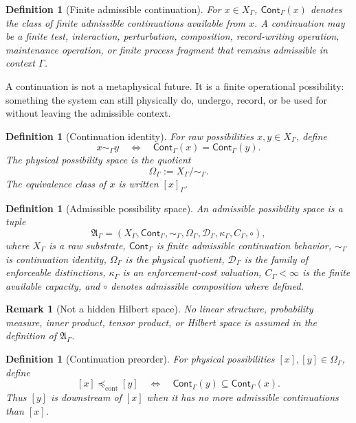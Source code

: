 \documentclass[11pt]{article}
\newtheorem{definition}[theorem]{Definition}
\newtheorem{remark}[theorem]{Remark}
\newcommand{\A}{\mathfrak A}
\newcommand{\Cont}{\mathsf{Cont}}
\newcommand{\preceqcont}{\preceq_{\mathrm{cont}}}
\begin{document}
\begin{definition}[Finite admissible continuation]
For $x\in X_\Gamma$, $\Cont_\Gamma(x)$ denotes the class of finite admissible continuations available from $x$.  A continuation may be a finite test, interaction, perturbation, composition, record-writing operation, maintenance operation, or finite process fragment that remains admissible in context $\Gamma$.
\end{definition}

A continuation is not a metaphysical future.  It is a finite operational possibility: something the system can still physically do, undergo, record, or be used for without leaving the admissible context.

\begin{definition}[Continuation identity]
For raw possibilities $x,y\in X_\Gamma$, define
\[
 x\sim_\Gamma y
 \quad\Longleftrightarrow\quad
 \Cont_\Gamma(x)=\Cont_\Gamma(y).
\]
The physical possibility space is the quotient
\[
 \Omega_\Gamma := X_\Gamma/\sim_\Gamma .
\]
The equivalence class of $x$ is written $[x]_\Gamma$.
\end{definition}

\begin{definition}[Admissible possibility space]
An \emph{admissible possibility space} is a tuple
\[
\A_\Gamma=
(X_\Gamma,\Cont_\Gamma,\sim_\Gamma,\Omega_\Gamma,
\mathcal D_\Gamma,\kappa_\Gamma,C_\Gamma,\circ),
\]
where $X_\Gamma$ is a raw substrate, $\Cont_\Gamma$ is finite admissible continuation behavior, $\sim_\Gamma$ is continuation identity, $\Omega_\Gamma$ is the physical quotient, $\mathcal D_\Gamma$ is the family of enforceable distinctions, $\kappa_\Gamma$ is an enforcement-cost valuation, $C_\Gamma<\infty$ is the finite available capacity, and $\circ$ denotes admissible composition where defined.
\end{definition}

\begin{remark}[Not a hidden Hilbert space]
No linear structure, probability measure, inner product, tensor product, or Hilbert space is assumed in the definition of $\A_\Gamma$.
\end{remark}

\begin{definition}[Continuation preorder]
For physical possibilities $[x],[y]\in\Omega_\Gamma$, define
\[
 [x]\preceqcont [y]
 \quad\Longleftrightarrow\quad
 \Cont_\Gamma(y)\subseteq \Cont_\Gamma(x).
\]
Thus $[y]$ is downstream of $[x]$ when it has no more admissible continuations than $[x]$.
\end{definition}
\end{document}
